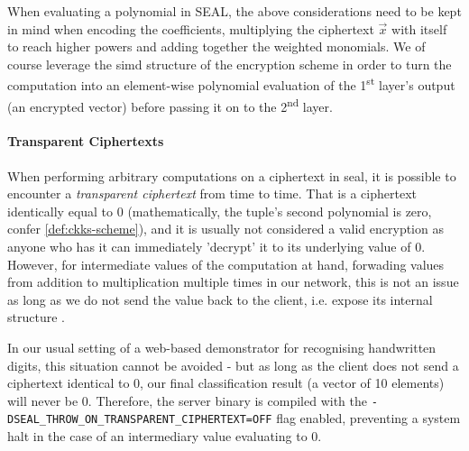 When evaluating a polynomial in SEAL, the above considerations need to be kept in mind when encoding the coefficients, multiplying the ciphertext $\vec{x}$ with itself to reach higher powers and adding together the weighted monomials.
We of course leverage the \gls{simd} structure of the encryption scheme in order to turn the computation into an element-wise polynomial evaluation of the 1\textsuperscript{st} layer's output (an encrypted vector) before passing it on to the 2\textsuperscript{nd} layer.

\paragraph{Transparent Ciphertexts}
When performing arbitrary computations on a ciphertext in \gls{seal}, it is possible to encounter a \textit{transparent ciphertext} from time to time.
That is a ciphertext identically equal to 0 (mathematically, the tuple's second polynomial is zero, confer \cref{def:ckks-scheme}), and it is usually not considered a valid encryption as anyone who has it can immediately 'decrypt' it to its underlying value of 0.
However, for intermediate values of the computation at hand, forwading values from addition to multiplication multiple times in our network, this is not an issue as long as we do not send the value back to the client, i.e. expose its internal structure \parencite{kim-laine-on-transparent-ciphertexts}.

In our usual setting of a web-based demonstrator for recognising handwritten digits, this situation cannot be avoided - but as long as the client does not send a ciphertext identical to 0, our final classification result (a vector of 10 elements) will never be 0.
Therefore, the server binary is compiled with the \texttt{-DSEAL_THROW_ON_TRANSPARENT_CIPHERTEXT=OFF} flag enabled, preventing a system halt in the case of an intermediary value evaluating to 0.
